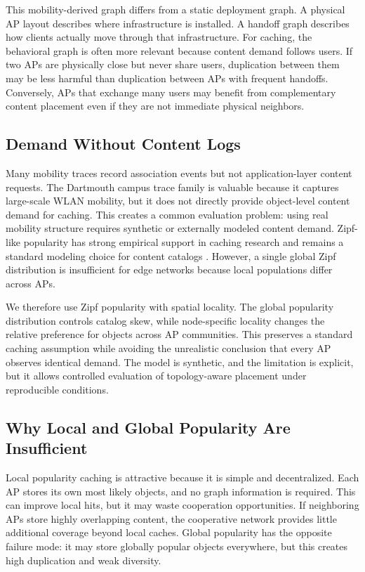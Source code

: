 This mobility-derived graph differs from a static deployment graph. A physical AP layout describes where infrastructure is installed. A handoff graph describes how clients actually move through that infrastructure. For caching, the behavioral graph is often more relevant because content demand follows users. If two APs are physically close but never share users, duplication between them may be less harmful than duplication between APs with frequent handoffs. Conversely, APs that exchange many users may benefit from complementary content placement even if they are not immediate physical neighbors.

\subsection{Demand Without Content Logs}

Many mobility traces record association events but not application-layer content requests. The Dartmouth campus trace family is valuable because it captures large-scale WLAN mobility, but it does not directly provide object-level content demand for caching. This creates a common evaluation problem: using real mobility structure requires synthetic or externally modeled content demand. Zipf-like popularity has strong empirical support in caching research and remains a standard modeling choice for content catalogs \cite{breslau1999zipf,Podlipnig2003}. However, a single global Zipf distribution is insufficient for edge networks because local populations differ across APs.

We therefore use Zipf popularity with spatial locality. The global popularity distribution controls catalog skew, while node-specific locality changes the relative preference for objects across AP communities. This preserves a standard caching assumption while avoiding the unrealistic conclusion that every AP observes identical demand. The model is synthetic, and the limitation is explicit, but it allows controlled evaluation of topology-aware placement under reproducible conditions.

\subsection{Why Local and Global Popularity Are Insufficient}

Local popularity caching is attractive because it is simple and decentralized. Each AP stores its own most likely objects, and no graph information is required. This can improve local hits, but it may waste cooperation opportunities. If neighboring APs store highly overlapping content, the cooperative network provides little additional coverage beyond local caches. Global popularity has the opposite failure mode: it may store globally popular objects everywhere, but this creates high duplication and weak diversity.

